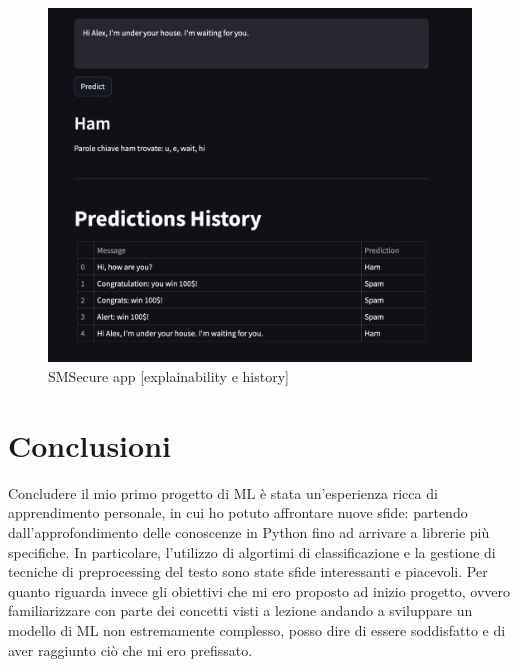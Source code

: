 \documentclass[]{article}
\begin{document}
            \begin{figure}[H]
                \centering
                \includegraphics[width=0.6\linewidth]{images/app2.png}
                \caption{SMSecure app [explainability e history]}
                \label{fig:enter-label}
            \end{figure}

        \newpage
        \section{Conclusioni}
            Concludere il mio primo progetto di ML è stata un'esperienza ricca di apprendimento personale, in cui ho potuto affrontare nuove sfide: partendo dall'approfondimento delle conoscenze in Python fino ad arrivare a librerie più specifiche. In particolare, l'utilizzo di algortimi di classificazione e la gestione di tecniche di preprocessing del testo sono state sfide interessanti e piacevoli. Per quanto riguarda invece gli obiettivi che mi ero proposto ad inizio progetto, ovvero familiarizzare con parte dei concetti visti a lezione andando a sviluppare un modello di ML non estremamente complesso, posso dire di essere soddisfatto e di aver raggiunto ciò che mi ero prefissato.


\newpage


\end{document}
